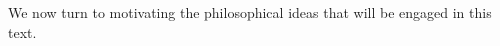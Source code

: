 \documentclass[11pt,titlepage]{report}
\numberwithin{equation}{subsection}
\renewcommand\subsection{\section}
\renewcommand{\phi}{\varphi}
\begin{document}
We now turn to motivating the philosophical ideas that will be engaged
in this text.






\end{document}
